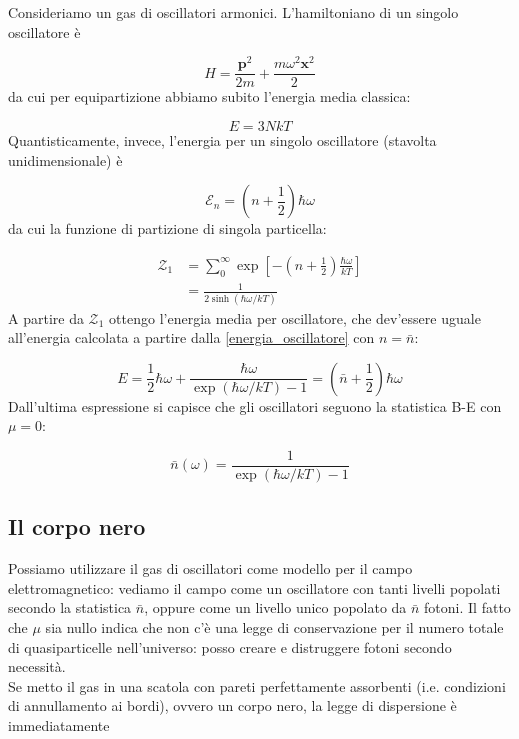 \documentclass[a4paper]{report}
\begin{document}
Consideriamo un gas di oscillatori armonici. L'hamiltoniano di un singolo oscillatore è

\begin{equation}
    H = \frac{\mathbf{p}^2}{2m} + \frac{m \omega^2 \mathbf{x}^2}{2} 
\end{equation}
da cui per equipartizione abbiamo subito l'energia media classica:

\begin{equation}
    E = 3 N k T
\end{equation}
Quantisticamente, invece, l'energia per un singolo oscillatore (stavolta unidimensionale) è

\begin{equation}
    \mathcal{E}_n = \left(n+\frac{1}{2}\right)\hbar \omega
    \label{energia_oscillatore}
\end{equation}
da cui la funzione di partizione di singola particella:

\begin{equation}
\begin{split}
    \mathcal{Z}_1 & = \sum_0^{\infty} \exp\left[-\left(n+\frac{1}{2}\right)\frac{\hbar\omega}{k T}\right] \\
    & = \frac{1}{2\sinh(\hbar\omega/k T)}
\end{split}
\end{equation}
A partire da $\mathcal{Z}_1$ ottengo l'energia media per oscillatore, che dev'essere uguale all'energia calcolata a partire dalla \eqref{energia_oscillatore} con $n = \bar{n}$:

\begin{equation}
    E = \frac{1}{2}\hbar \omega +\frac{\hbar\omega}{\exp(\hbar\omega/k T)-1} = \left(\bar{n}+\frac{1}{2}\right)\hbar \omega 
\end{equation}
Dall'ultima espressione si capisce che gli oscillatori seguono la statistica B-E con $\mu = 0$:

\begin{equation}
    \bar{n}(\omega) = \frac{1}{\exp(\hbar\omega/k T)-1}
\end{equation}

\subsection{Il corpo nero}

Possiamo utilizzare il gas di oscillatori come modello per il campo elettromagnetico: vediamo il campo come un oscillatore con tanti livelli popolati secondo la statistica $\bar{n}$, oppure come un livello unico popolato da $\bar{n}$ fotoni. Il fatto che $\mu$ sia nullo indica che non c'è una legge di conservazione per il numero totale di quasiparticelle nell'universo: posso creare e distruggere fotoni secondo necessità.\\
Se metto il gas in una scatola con pareti perfettamente assorbenti (i.e. condizioni di annullamento ai bordi), ovvero un corpo nero, la legge di dispersione è immediatamente
\end{document}
